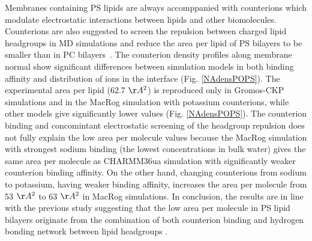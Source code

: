 \documentclass[aps,prl,superscriptaddress,twocolumn]{revtex4}
\begin{document}
Membranes containing PS lipids are always accomppanied with counterions which
modulate electrostatic interactions between lipids and other biomolecules. 
Counterions are also suggested to screen the repulsion between charged lipid headgroups 
in MD simulations and reduce the area per lipid of PS bilayers to be smaller than in PC
bilayers~\cite{pandit02,mukhopadhyay04,pedersen06}. 
The counterion density profiles along membrane normal 
show significant differences between simulation models in both binding affinity
and distribution of ions in the interface (Fig. \ref{NAdensPOPS}).
The experimental area per lipid (62.7 $\AA^2$) \cite{pan14} 
is reproduced only in Gromos-CKP simulations and in the MacRog simulation
with potassium counterions, while other models give significantly lower values (Fig. \ref{NAdensPOPS}).
The counterion binding and concomintant electrostatic screening of the headgroup
repulsion does not fully explain the low area per molecule values
because the MacRog simulation with strongest sodium binding
(the lowest concentrations in bulk water) gives the same area per molecule
as CHARMM36ua simulation with significantly weaker counterion binding
affinity. On the other hand, changing counterions from sodium to potassium, having weaker binding
affinity, increases the area per molecule from 53 $\AA^2$ to 63 $\AA^2$ in MacRog simulations.
In conclusion, the results are in line with the previous study suggesting that the
low area per molecule in PS lipid bilayers originate from the combination
of both counterion binding and hydrogen bonding network between lipid
headgroups \cite{petrache04}.
\end{document}

